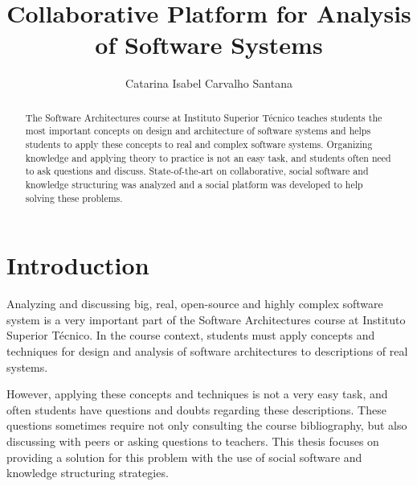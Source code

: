 \documentclass{llncs}
\begin{document}
\title{Collaborative Platform for Analysis of Software Systems}
%
%
\author{Catarina Isabel Carvalho Santana}
%
%
%
%
%

\maketitle              %

\begin{abstract}
The Software Architectures course at Instituto Superior T\'{e}cnico teaches students the most important concepts on design and architecture of software systems and helps students to apply these concepts to real and complex software systems. Organizing knowledge and applying theory to practice is not an easy task, and students often need to ask questions and discuss. State-of-the-art on collaborative, social software and knowledge structuring was analyzed and a social platform was developed to help solving these problems.

\end{abstract}
%
\section{Introduction}
\label{introduction}
Analyzing and discussing big, real, open-source and highly complex software system is a very important part of the Software Architectures course at Instituto Superior T\'{e}cnico. In the course context, students must apply concepts and techniques for design and analysis of software architectures to descriptions of real systems. 

However, applying these concepts and techniques is not a very easy task, and often students have questions and doubts regarding these descriptions. These questions sometimes require not only consulting the course bibliography, but also discussing with peers or asking questions to teachers. This thesis focuses on providing a solution for this problem with the use of social software and knowledge structuring strategies.
\end{document}
